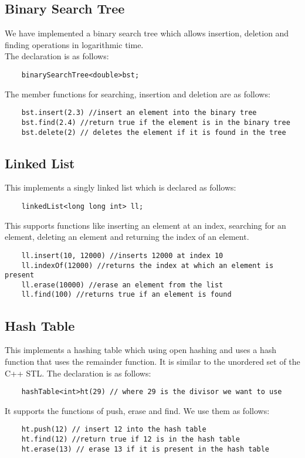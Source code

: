 \documentclass[12pt]{article}
\begin{document}
\subsection{Binary Search Tree}
We have implemented a binary search tree which allows insertion, deletion and finding operations in logarithmic time.
\\
The declaration is as follows:
\begin{verbatim}
    binarySearchTree<double>bst;
\end{verbatim}
The member functions for searching, insertion and deletion are as follows:
\begin{verbatim}
    bst.insert(2.3) //insert an element into the binary tree
    bst.find(2.4) //return true if the element is in the binary tree
    bst.delete(2) // deletes the element if it is found in the tree
\end{verbatim}

\subsection{Linked List}
This implements a singly linked list which is declared as follows:
\begin{verbatim}
    linkedList<long long int> ll;
\end{verbatim}
This supports functions like inserting an element at an index, searching for an element, deleting an element and returning the index of an element.
\begin{verbatim}
    ll.insert(10, 12000) //inserts 12000 at index 10
    ll.indexOf(12000) //returns the index at which an element is present
    ll.erase(10000) //erase an element from the list
    ll.find(100) //returns true if an element is found
\end{verbatim}

\subsection{Hash Table}
This implements a hashing table which using open hashing and uses a hash function that uses the remainder function. It is similar to the unordered set of the C++ STL. The declaration is as follows:
\begin{verbatim}
    hashTable<int>ht(29) // where 29 is the divisor we want to use
\end{verbatim}
It supports the functions of push, erase and find. We use them as follows:
\begin{verbatim}
    ht.push(12) // insert 12 into the hash table
    ht.find(12) //return true if 12 is in the hash table
    ht.erase(13) // erase 13 if it is present in the hash table 
\end{verbatim}
\end{document}
